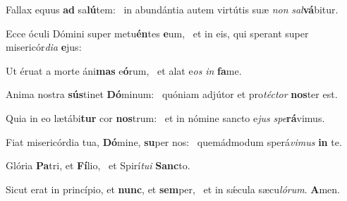 \item Fallax equus \textbf{ad} sa\textbf{lú}tem:~\psstar{} in abundántia autem virtútis suæ \textit{non} \textit{sal}\textbf{vá}bitur.
\item Ecce óculi Dómini super metu\textbf{én}tes \textbf{e}um,~\psstar{} et in eis, qui sperant super misericór\textit{dia} \textbf{e}jus:
\item Ut éruat a morte áni\textbf{mas} e\textbf{ó}rum,~\psstar{} et alat e\textit{os} \textit{in} \textbf{fa}me.
\item Anima nostra \textbf{sús}tinet \textbf{Dó}minum:~\psstar{} quóniam adjútor et pro\textit{téctor} \textbf{nos}ter est.
\item Quia in eo lætábi\textbf{tur} cor \textbf{nos}trum:~\psstar{} et in nómine sancto e\textit{jus} \textit{spe}\textbf{rá}vimus.
\item Fiat misericórdia tua, \textbf{Dó}mine, \textbf{su}per nos:~\psstar{} quemádmodum sperá\textit{vimus} \textbf{in} te.
\item Glória \textbf{Pa}tri, et \textbf{Fí}lio,~\psstar{} et Spirí\textit{tui} \textbf{Sanc}to.
\item Sicut erat in princípio, et \textbf{nunc}, et \textbf{sem}per,~\psstar{} et in sǽcula sæcu\textit{lórum}. \textbf{A}men.